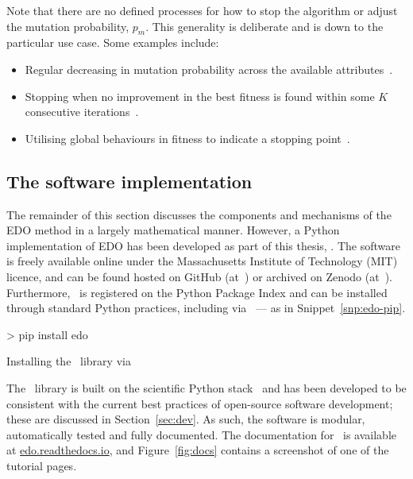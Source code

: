 
Note that there are no defined processes for how to stop the algorithm or adjust
the mutation probability, \(p_m\). This generality is deliberate and is down to
the particular use case. Some examples include:

\begin{itemize}
    \item Regular decreasing in mutation probability across the available
        attributes~\cite{Kuehn2013}.
    \item Stopping when no improvement in the best fitness is found within some
        \(K\) consecutive iterations~\cite{Leung2001}.
    \item Utilising global behaviours in fitness to indicate a stopping
        point~\cite{Marti2016}.
\end{itemize}


\subsection{The software implementation}

The remainder of this section discusses the components and mechanisms of the EDO
method in a largely mathematical manner. However, a Python implementation of EDO
has been developed as part of this thesis, \edo. The software is freely
available online under the Massachusetts Institute of Technology (MIT) licence,
and can be found hosted on GitHub (at~) or archived on
Zenodo (at~). Furthermore, \edo\ is registered on
the Python Package Index and can be installed through standard Python practices,
including via \pip\ --- as in Snippet~\ref{snp:edo-pip}.

\begin{listing}[htbp]
\begin{usagesh}
> pip install edo
\end{usagesh}
\caption{Installing the \edo\ library via \pip}\label{snp:edo-pip}
\end{listing}

The \edo\ library is built on the scientific Python stack~\cite{pandas,numpy}
and has been developed to be consistent with the current best practices of
open-source software development; these are discussed in
Section~\ref{sec:dev}. As such, the software is modular, automatically tested
and fully documented. The documentation for \edo\ is available at
\url{edo.readthedocs.io}, and Figure~\ref{fig:docs} contains a screenshot of one
of the tutorial pages.

